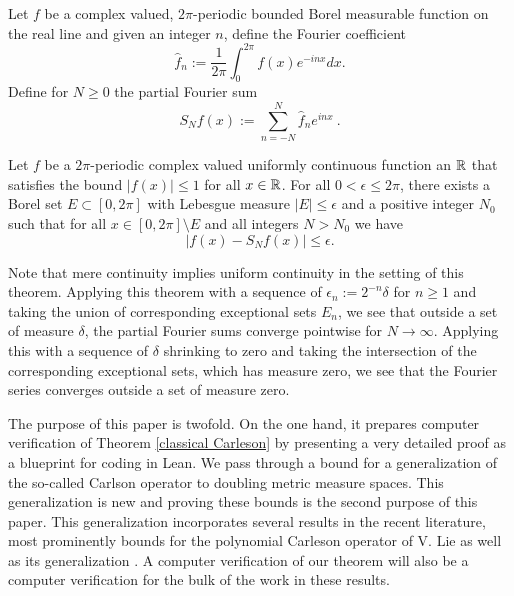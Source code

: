 Let $f$ be a complex valued, $2\pi $-periodic bounded Borel measurable function on the real line and given an integer $n$, define the Fourier coefficient
\begin{equation}
    \widehat{f}_n:=\frac {1}{2\pi} \int_0^{2\pi} f(x) e^{- i nx} dx .
\end{equation}
Define for $N\ge 0$ the partial Fourier sum
\begin{equation}
    S_Nf(x):=\sum_{n=-N}^N \widehat{f}_n e^{i nx}\ .
\end{equation}
\begin{theorem}\label{classical Carleson}
Let $f$ be a $2\pi $-periodic complex valued uniformly continuous function an $\mathbb{R}$ that satisfies the bound
$|f(x)|\le 1$ for all $x\in \mathbb{R}$. For all $0<\epsilon\le 2\pi$,
there exists a Borel set $E\subset [0,2\pi]$ with Lebesgue measure
$|E|\le \epsilon$ and a positive integer $N_0$ such that for all
$x\in [0,2\pi]\setminus E$ and all integers $N>N_0$ we have
\begin{equation}\label{aeconv}
|f(x)-S_N f(x)|\le \epsilon.
\end{equation}
\end{theorem}

Note that mere continuity implies uniform continuity
in the setting of this theorem. Applying this theorem
with a sequence of $\epsilon_n:= 2^{-n}\delta$ for $n\ge 1$
and taking the union of corresponding exceptional sets $E_n$, we see that
outside a set of measure $\delta$, the partial Fourier sums
converge pointwise for $N\to \infty$. Applying this with a sequence
of $\delta$ shrinking to zero and taking the intersection of the corresponding exceptional
sets, which has measure zero, we see that the Fourier series converges outside
a set of measure zero.

The purpose of this paper is twofold.
On the one hand, it prepares computer verification of Theorem \ref{classical Carleson} by presenting a very detailed proof as a blueprint for coding in Lean.
We pass through a bound for a
generalization of the so-called Carlson operator
to doubling metric measure spaces. This generalization is new
and proving these bounds is the second purpose of this paper.
This generalization incorporates several results in the recent literature, most prominently bounds for the polynomial Carleson
operator of V. Lie \cite{lie-polynomial}
as well as its generalization \cite{zk-polynomial}.
A computer verification of our theorem will also be a computer
verification for the bulk of the work in these results.



